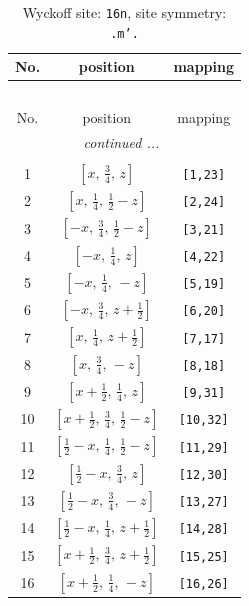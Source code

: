 \documentclass[fleqn,8pt]{jsarticle}
\begin{document}
\renewcommand{\arraystretch}{1.2}
\begin{longtable}{ccc}
\caption{Wyckoff site: {\tt 16n}, site symmetry: {\tt .m'.}}
 \\
 \hline \hline
No. & position & mapping \\ \hline \endfirsthead

\multicolumn{2}{l}{\tablename\ \thetable{}} \\
 \hline \hline
No. & position & mapping \\ \hline \endhead

 \hline \hline
\multicolumn{2}{r}{\footnotesize\it continued ...} \\ \endfoot

 \hline \hline
\multicolumn{2}{r}{} \\ \endlastfoot

1 & $\left[ x,\, \frac{3}{4},\, z \right]$ & {\tt [1,23]} \\ \hline
2 & $\left[ x,\, \frac{1}{4},\, \frac{1}{2} - z \right]$ & {\tt [2,24]} \\ \hline
3 & $\left[ - x,\, \frac{3}{4},\, \frac{1}{2} - z \right]$ & {\tt [3,21]} \\ \hline
4 & $\left[ - x,\, \frac{1}{4},\, z \right]$ & {\tt [4,22]} \\ \hline
5 & $\left[ - x,\, \frac{1}{4},\, - z \right]$ & {\tt [5,19]} \\ \hline
6 & $\left[ - x,\, \frac{3}{4},\, z + \frac{1}{2} \right]$ & {\tt [6,20]} \\ \hline
7 & $\left[ x,\, \frac{1}{4},\, z + \frac{1}{2} \right]$ & {\tt [7,17]} \\ \hline
8 & $\left[ x,\, \frac{3}{4},\, - z \right]$ & {\tt [8,18]} \\ \hline
9 & $\left[ x + \frac{1}{2},\, \frac{1}{4},\, z \right]$ & {\tt [9,31]} \\ \hline
10 & $\left[ x + \frac{1}{2},\, \frac{3}{4},\, \frac{1}{2} - z \right]$ & {\tt [10,32]} \\ \hline
11 & $\left[ \frac{1}{2} - x,\, \frac{1}{4},\, \frac{1}{2} - z \right]$ & {\tt [11,29]} \\ \hline
12 & $\left[ \frac{1}{2} - x,\, \frac{3}{4},\, z \right]$ & {\tt [12,30]} \\ \hline
13 & $\left[ \frac{1}{2} - x,\, \frac{3}{4},\, - z \right]$ & {\tt [13,27]} \\ \hline
14 & $\left[ \frac{1}{2} - x,\, \frac{1}{4},\, z + \frac{1}{2} \right]$ & {\tt [14,28]} \\ \hline
15 & $\left[ x + \frac{1}{2},\, \frac{3}{4},\, z + \frac{1}{2} \right]$ & {\tt [15,25]} \\ \hline
16 & $\left[ x + \frac{1}{2},\, \frac{1}{4},\, - z \right]$ & {\tt [16,26]} \\
\end{longtable}
\end{document}
